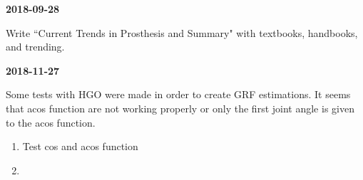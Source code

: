 \textbf{2018-09-28}

Write ``Current Trends in Prosthesis and Summary" with textbooks, handbooks, and trending.

\textbf{2018-11-27}

Some tests with HGO were made in order to create GRF estimations. It seems that acos function are not working properly or only the first joint angle is given to the acos function. 

\begin{enumerate}
    \item Test cos and acos function
    \item 
\end{enumerate}

